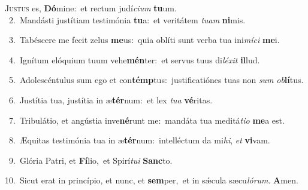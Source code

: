 \lettrine{\initial\textcolor{\initialcolor}{J}}{ustus} es, \textbf{Dó}\-mine:~\star et rectum judí\-\textit{ci}\-\textit{um} \textbf{tu}\-um.\\
{\numbfont\textcolor{\numbcolor}{~2.}}~Mandásti justítiam testimónia \textbf{tu}\-a:~\star et veritátem \textit{tu}\-\textit{am} \textbf{ni}\-mis.\par
{\numbfont\textcolor{\numbcolor}{~3.}}~Tabéscere me fecit zelus \textbf{me}\-us:~\star quia oblíti sunt verba tua ini\-\textit{mí}\-\textit{ci} \textbf{me}\-i.\par
{\numbfont\textcolor{\numbcolor}{~4.}}~Ignítum elóquium tuum vehe\-\textbf{mén}\-ter:~\star et servus tuus di\-\textit{lé}\-\textit{xit} \textbf{il}\-lud.\par
{\numbfont\textcolor{\numbcolor}{~5.}}~Adolescéntulus sum ego et con\-\textbf{témp}\-tus:~\star justificatiónes tuas non \textit{sum} \textit{ob}\-\textbf{lí}tus.\par
{\numbfont\textcolor{\numbcolor}{~6.}}~Justítia tua, justítia in æ\-\textbf{tér}\-num:~\star et lex \textit{tu}\-\textit{a} \textbf{vé}\-ritas.\par
{\numbfont\textcolor{\numbcolor}{~7.}}~Tribulátio, et angústia inve\-\textbf{né}\-runt me:~\star mandáta tua meditá\-\textit{ti}\-\textit{o} \textbf{me}\-a est.\par
{\numbfont\textcolor{\numbcolor}{~8.}}~Æquitas testimónia tua in æ\-\textbf{tér}\-num:~\star intelléctum da mi\-\textit{hi}\-, \textit{et} \textbf{vi}\-vam.\par
{\numbfont\textcolor{\numbcolor}{~9.}}~Glória Patri, et \textbf{Fí}\-lio,~\star et Spirí\-\textit{tu}\-\textit{i} \textbf{Sanc}\-to.\par
{\numbfont\textcolor{\numbcolor}{10.}}~Sicut erat in princípio, et nunc, et \textbf{sem}\-per,~\star et in sǽcula sæcu\-\textit{ló}\-\textit{rum}. \textbf{A}\-men.\par
